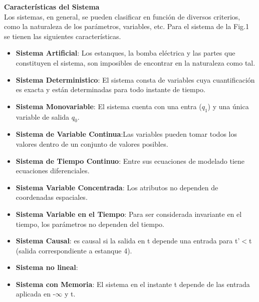 \documentclass[11pt,letterpaper,spanish,notitlepage]{report}
\begin{document}
 \textbf{Características del Sistema}\\
    \justify Los sistemas, en general, se pueden clasificar en función de diversos criterios, como la naturaleza de los parámetros, variables, etc. Para el sistema de la Fig.1 se tienen las siguientes características.\\
    \begin{itemize}
    
    \item \textbf{Sistema Artificial}: Los estanques, la bomba eléctrica y las partes que constituyen el sistema, son imposibles de encontrar en la naturaleza como tal.
    
    \item \textbf{Sistema Deterministico}: El sistema consta de variables cuya cuantificación es exacta y están determinadas para todo instante de tiempo. 
    
    \item \textbf{Sistema Monovariable}: El sistema cuenta con una entra ($q_{1}$) y una única variable de salida $q_{0}$.
    
    \item \textbf{Sistema de Variable Continua}:Las variables pueden tomar todos los valores dentro de un conjunto de valores posibles.
    
    \item \textbf{Sistema de Tiempo Continuo}: Entre sus ecuaciones de modelado tiene ecuaciones diferenciales.
    
     \item \textbf{Sistema Variable Concentrada}: Los atributos no dependen de coordenadas espaciales.
     
     \item \textbf{Sistema Variable en el Tiempo}: Para ser considerada invariante en el tiempo, los parámetros no dependen del tiempo.
    
    \item \textbf{Sistema Causal}: es causal si la salida en t depende una entrada para t'$<$t (salida correspondiente a estanque 4).
    
    \item\textbf{Sistema no lineal}:
    
    \item \textbf{Sistema con Memoria}: El sistema en el instante t depende de las entrada aplicada en -$\infty$ y t.
     \end{itemize}
\end{document}
